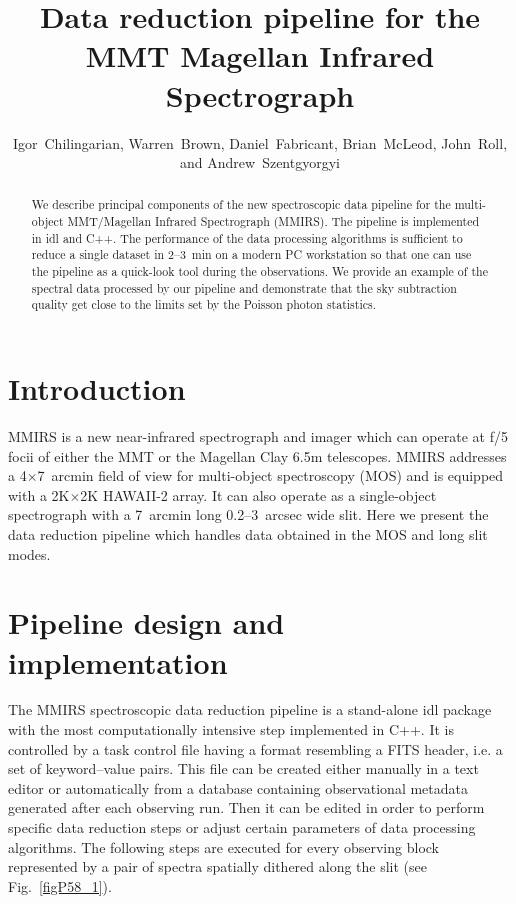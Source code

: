 \documentclass[11pt,twoside]{article}
\begin{document}
\title{Data reduction pipeline for the MMT Magellan Infrared Spectrograph
}
\author{Igor~Chilingarian, 
Warren~Brown, Daniel~Fabricant, 
Brian~McLeod, John~Roll,
and Andrew~Szentgyorgyi
}

\begin{abstract} We describe principal components of the new spectroscopic
data pipeline for the multi-object MMT/Magellan Infrared Spectrograph
(MMIRS).  The pipeline is implemented in {\sc idl} and {\sc C++}.  The
performance of the data processing algorithms is sufficient to reduce a
single dataset in 2--3~min on a modern PC workstation so that one can use
the pipeline as a quick-look tool during the observations.  We provide an
example of the spectral data processed by our pipeline and demonstrate that
the sky subtraction quality get close to the limits set by the Poisson
photon statistics.
\end{abstract}

\section{Introduction} 

MMIRS \citep{McLeod+12} is a new near-infrared spectrograph and imager which
can operate at f/5 focii of either the MMT or the Magellan Clay 6.5m
telescopes.  MMIRS addresses a 4$\times$7~arcmin field of view for
multi-object spectroscopy (MOS) and is equipped with a 2K$\times$2K HAWAII-2
array.  It can also operate as a single-object spectrograph with a 7~arcmin
long 0.2--3~arcsec wide slit.  Here we present the data reduction pipeline
which handles data obtained in the MOS and long slit modes.

\section{Pipeline design and implementation}

The MMIRS spectroscopic data reduction pipeline is a stand-alone {\sc idl}
package with the most computationally intensive step implemented in {\sc
C++}.  It is controlled by a task control file having a format resembling a
FITS header, i.e.  a set of keyword--value pairs.  This file can be created
either manually in a text editor or automatically from a database containing
observational metadata generated after each observing run.  Then it can be
edited in order to perform specific data reduction steps or adjust certain
parameters of data processing algorithms.  The following steps are
executed for every observing block represented by a pair of spectra
spatially dithered along the slit (see Fig.~\ref{figP58_1}).
\end{document}
